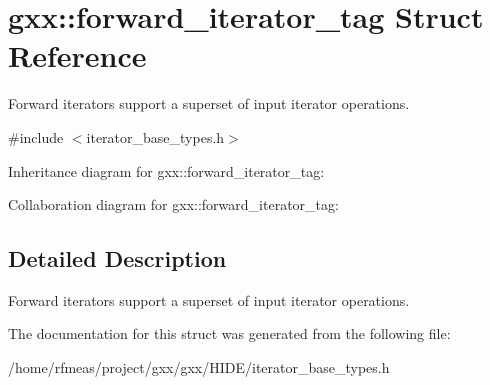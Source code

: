\hypertarget{structgxx_1_1forward__iterator__tag}{}\section{gxx\+:\+:forward\+\_\+iterator\+\_\+tag Struct Reference}
\label{structgxx_1_1forward__iterator__tag}


Forward iterators support a superset of input iterator operations.  




{\ttfamily \#include $<$iterator\+\_\+base\+\_\+types.\+h$>$}



Inheritance diagram for gxx\+:\+:forward\+\_\+iterator\+\_\+tag\+:


Collaboration diagram for gxx\+:\+:forward\+\_\+iterator\+\_\+tag\+:


\subsection{Detailed Description}
Forward iterators support a superset of input iterator operations. 

The documentation for this struct was generated from the following file\+:\begin{DoxyCompactItemize}
\item 
/home/rfmeas/project/gxx/gxx/\+H\+I\+D\+E/iterator\+\_\+base\+\_\+types.\+h\end{DoxyCompactItemize}
